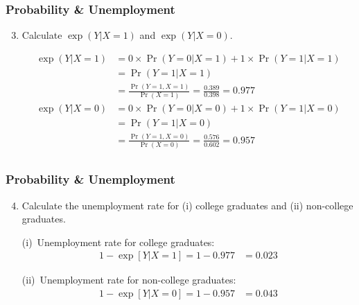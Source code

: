 \begin{frame}
\frametitle{Probability \& Unemployment}
\begin{enumerate}\setcounter{enumi}{2}

\item Calculate $\exp(Y|X=1)$ and $\exp(Y|X=0)$.

\begin{answer}
\begin{align*}
\exp(Y|X=1) & = 0 \times \Pr(Y=0|X=1) + 1 \times \Pr(Y=1|X=1) \\
  & = \Pr(Y=1|X=1) \\
  & = \frac{\Pr(Y=1,X=1)}{\Pr(X=1)}
    = \frac{0.389}{0.398}
    = 0.977 \\[1ex]
\exp(Y|X=0) & = 0 \times \Pr(Y=0|X=0) + 1 \times \Pr(Y=1|X=0) \\
  & = \Pr(Y=1|X=0) \\
  & = \frac{\Pr(Y=1,X=0)}{\Pr(X=0)}
    = \frac{0.576}{0.602}
    = 0.957 \\
\end{align*}
\end{answer}

\end{enumerate}
\end{frame}


\begin{frame}
\frametitle{Probability \& Unemployment}
\begin{enumerate}\setcounter{enumi}{3}

\item Calculate the unemployment rate for (i) college graduates and (ii) non-college graduates.

\begin{answer}
(i)~Unemployment rate for college graduates:
\begin{align*}
1 - \exp[Y|X=1] 
  = 1 - 0.977
  & = 0.023
\end{align*}

(ii)~Unemployment rate for non-college graduates:
\begin{align*}
1 - \exp[Y|X=0] 
  = 1 - 0.957
  & = 0.043
\end{align*}
\end{answer}

\end{enumerate}
\end{frame}


